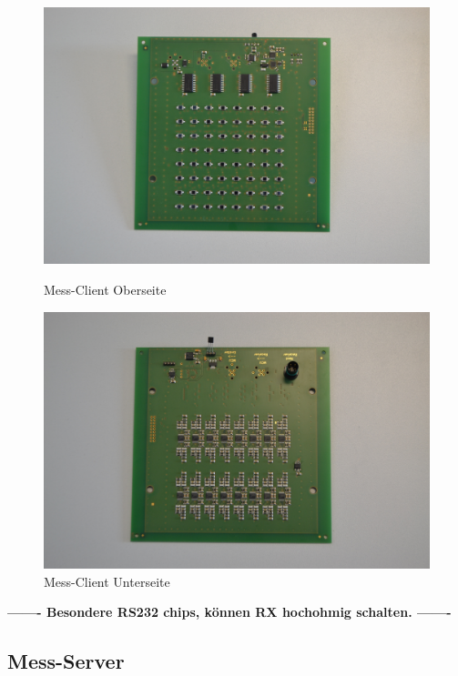  \begin{figure}[!htb]
  \includegraphics[width=\linewidth]{img/general/DegraBoardTop.jpg}
  \caption{Mess-Client Oberseite}\label{figure_DegraBoardTop}
\endminipage\hfill
{}%
  \includegraphics[width=\linewidth]{img/general/DegraBoardBottom.jpg}
  \caption{Mess-Client Unterseite}\label{figure_DegraBoardBottom}
\endminipage
\end{figure}


\textbf{------- Besondere RS232 chips, können RX hochohmig schalten. -------}


\subsection{Mess-Server}
\label{section_Mess-Server}

